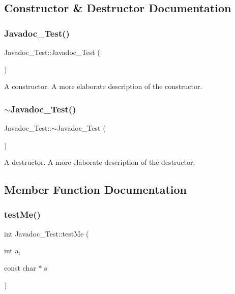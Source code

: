 \subsection{Constructor \& Destructor Documentation}
\hypertarget{class_javadoc___test_a17313327932ae97596b0a455ba8342cc}{}\label{class_javadoc___test_a17313327932ae97596b0a455ba8342cc} 
\subsubsection{\texorpdfstring{Javadoc\+\_\+\+Test()}{Javadoc\_Test()}}
{\footnotesize\ttfamily Javadoc\+\_\+\+Test\+::\+Javadoc\+\_\+\+Test (\begin{DoxyParamCaption}{ }\end{DoxyParamCaption})}

A constructor. A more elaborate description of the constructor. \hypertarget{class_javadoc___test_a60016cd15a4ed82bbc35be79a0a6a6b5}{}\label{class_javadoc___test_a60016cd15a4ed82bbc35be79a0a6a6b5} 
\subsubsection{\texorpdfstring{$\sim$\+Javadoc\+\_\+\+Test()}{~Javadoc\_Test()}}
{\footnotesize\ttfamily Javadoc\+\_\+\+Test\+::$\sim$\+Javadoc\+\_\+\+Test (\begin{DoxyParamCaption}{ }\end{DoxyParamCaption})}

A destructor. A more elaborate description of the destructor. 

\subsection{Member Function Documentation}
\hypertarget{class_javadoc___test_a0c472683ed25ff096e8a9edfb18d550c}{}\label{class_javadoc___test_a0c472683ed25ff096e8a9edfb18d550c} 
\subsubsection{\texorpdfstring{test\+Me()}{testMe()}}
{\footnotesize\ttfamily int Javadoc\+\_\+\+Test\+::test\+Me (\begin{DoxyParamCaption}\item[{int}]{a,  }\item[{const char $\ast$}]{s }\end{DoxyParamCaption})}


